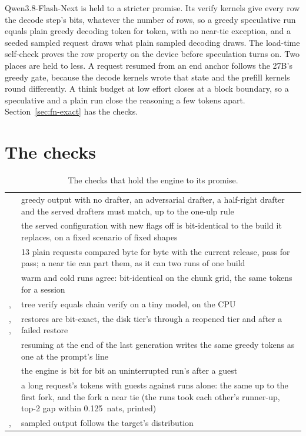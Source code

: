 Qwen3.8-Flash-Next is held to a stricter promise. Its verify kernels give every row the decode step's bits, whatever the number of rows, so a greedy speculative run equals plain greedy decoding token for token, with no near-tie exception, and a seeded sampled request draws what plain sampled decoding draws. The load-time self-check proves the row property on the device before speculation turns on. Two places are held to less. A request resumed from an end anchor follows the 27B's greedy gate, because the decode kernels wrote that state and the prefill kernels round differently. A think budget at low effort closes at a block boundary, so a speculative and a plain run close the reasoning a few tokens apart. Section~\ref{sec:fn-exact} has the checks.

\section{The checks}

\begin{table}[H]
\centering\small
\caption{The checks that hold the engine to its promise.}\label{tab:exactness-checks}
\begin{tabularx}{\linewidth}{@{}L{.38\linewidth}Y@{}}
\toprule
{} &  \\
\midrule
{} & greedy output with no drafter, an adversarial drafter, a half-right drafter and the served drafters must match, up to the one-ulp rule \\
 & the served configuration with new flags off is bit-identical to the build it replaces, on a fixed scenario of fixed shapes \\
 & 13 plain requests compared byte for byte with the current release, pass for pass; a near tie can part them, as it can two runs of one build \\
 & warm and cold runs agree: bit-identical on the chunk grid, the same tokens for a session \\
,  & tree verify equals chain verify on a tiny model, on the CPU \\
, ,  & restores are bit-exact, the disk tier's through a reopened tier and after a failed restore \\
 & resuming at the end of the last generation writes the same greedy tokens as one at the prompt's line \\
 & the engine is bit for bit an uninterrupted run's after a guest \\
 & a long request's tokens with guests against runs alone: the same up to the first fork, and the fork a near tie (the runs took each other's runner-up, top-2 gap within 0.125~nats, printed) \\
,  & sampled output follows the target's distribution \\
\bottomrule
\end{tabularx}
\end{table}
